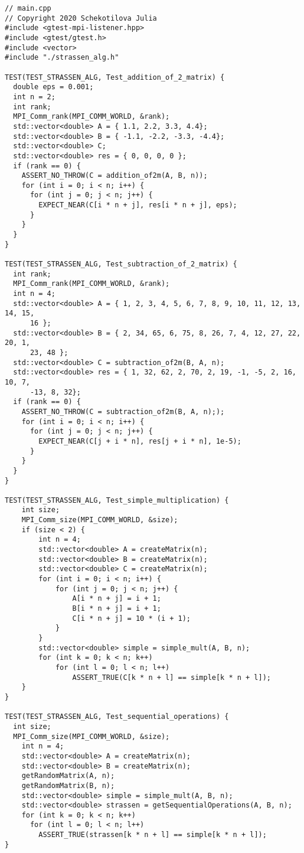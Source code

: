 \documentclass{report}
\begin{document}
\begin{lstlisting}
// main.cpp
// Copyright 2020 Schekotilova Julia
#include <gtest-mpi-listener.hpp>
#include <gtest/gtest.h>
#include <vector>
#include "./strassen_alg.h"

TEST(TEST_STRASSEN_ALG, Test_addition_of_2_matrix) {
  double eps = 0.001;
  int n = 2;
  int rank;
  MPI_Comm_rank(MPI_COMM_WORLD, &rank);
  std::vector<double> A = { 1.1, 2.2, 3.3, 4.4};
  std::vector<double> B = { -1.1, -2.2, -3.3, -4.4};
  std::vector<double> C;
  std::vector<double> res = { 0, 0, 0, 0 };
  if (rank == 0) {
    ASSERT_NO_THROW(C = addition_of2m(A, B, n));
    for (int i = 0; i < n; i++) {
      for (int j = 0; j < n; j++) {
        EXPECT_NEAR(C[i * n + j], res[i * n + j], eps);
      }
    }
  }
}

TEST(TEST_STRASSEN_ALG, Test_subtraction_of_2_matrix) {
  int rank;
  MPI_Comm_rank(MPI_COMM_WORLD, &rank);
  int n = 4;
  std::vector<double> A = { 1, 2, 3, 4, 5, 6, 7, 8, 9, 10, 11, 12, 13, 14, 15,
      16 };
  std::vector<double> B = { 2, 34, 65, 6, 75, 8, 26, 7, 4, 12, 27, 22, 20, 1,
      23, 48 };
  std::vector<double> C = subtraction_of2m(B, A, n);
  std::vector<double> res = { 1, 32, 62, 2, 70, 2, 19, -1, -5, 2, 16, 10, 7,
      -13, 8, 32};
  if (rank == 0) {
    ASSERT_NO_THROW(C = subtraction_of2m(B, A, n););
    for (int i = 0; i < n; i++) {
      for (int j = 0; j < n; j++) {
        EXPECT_NEAR(C[j + i * n], res[j + i * n], 1e-5);
      }
    }
  }
}

TEST(TEST_STRASSEN_ALG, Test_simple_multiplication) {
    int size;
    MPI_Comm_size(MPI_COMM_WORLD, &size);
    if (size < 2) {
        int n = 4;
        std::vector<double> A = createMatrix(n);
        std::vector<double> B = createMatrix(n);
        std::vector<double> C = createMatrix(n);
        for (int i = 0; i < n; i++) {
            for (int j = 0; j < n; j++) {
                A[i * n + j] = i + 1;
                B[i * n + j] = i + 1;
                C[i * n + j] = 10 * (i + 1);
            }
        }
        std::vector<double> simple = simple_mult(A, B, n);
        for (int k = 0; k < n; k++)
            for (int l = 0; l < n; l++)
                ASSERT_TRUE(C[k * n + l] == simple[k * n + l]);
    }
}

TEST(TEST_STRASSEN_ALG, Test_sequential_operations) {
  int size;
  MPI_Comm_size(MPI_COMM_WORLD, &size);
    int n = 4;
    std::vector<double> A = createMatrix(n);
    std::vector<double> B = createMatrix(n);
    getRandomMatrix(A, n);
    getRandomMatrix(B, n);
    std::vector<double> simple = simple_mult(A, B, n);
    std::vector<double> strassen = getSequentialOperations(A, B, n);
    for (int k = 0; k < n; k++)
      for (int l = 0; l < n; l++)
        ASSERT_TRUE(strassen[k * n + l] == simple[k * n + l]);
}


\end{lstlisting}
\end{document}
